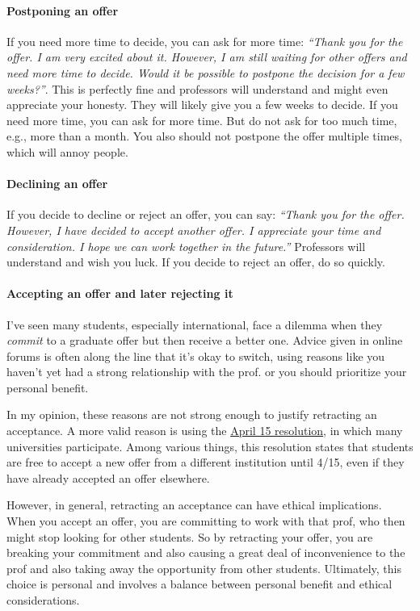 \documentclass[oneside,11pt,dvipsnames]{book}
\begin{document}
\paragraph{Postponing an offer} If you need more time to decide, you can ask for more time: \emph{``Thank you for the offer.  I am very excited about it.  However, I am still waiting for other offers and need more time to decide.  Would it be possible to postpone the decision for a few weeks?''}.  This is perfectly fine and professors will understand and might even appreciate your honesty.  They will likely give you a few weeks to decide.  If you need more time, you can ask for more time.  But do not ask for too much time, e.g., more than a month.  You also should not postpone the offer multiple times, which will annoy people.



\paragraph{Declining an offer} If you decide to decline or reject an offer, you can say: \emph{``Thank you for the offer. However, I have decided to accept another offer.  I appreciate your time and consideration.  I hope we can work together in the future.''}  Professors will understand and wish you luck.  If you decide to reject an offer, do so quickly.


\paragraph{Accepting an offer and later rejecting it}

I've seen many students, especially international, face a dilemma when they \emph{commit} to a graduate offer but then receive a better one. Advice given in online forums is often along the line that it's okay to switch, using reasons like you haven't yet had a strong relationship with the prof. or you should prioritize your personal benefit.

In my opinion, these reasons are not strong enough to justify retracting an acceptance. A more valid reason is using the \href{https://cgsnet.org/wp-content/uploads/2024/01/CGS_April15_Resolution_Jan312024.pdf}{April 15 resolution}, in which many universities participate. Among various things, this resolution states that students are free to accept a new offer from a different institution until 4/15, even if they have already accepted an offer elsewhere. 

However, in general, retracting an acceptance can have ethical implications. When you accept an offer, you are committing to work with that prof, who then might stop looking for other students. So by retracting your offer, you are breaking your commitment and also causing a great deal of inconvenience to the prof and also taking away the opportunity from other students. 
Ultimately, this choice is personal and involves a balance between personal benefit and ethical considerations.
\end{document}
